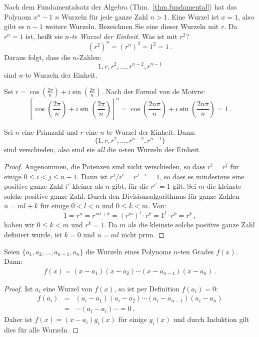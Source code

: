 Nach dem Fundamentalsatz der Algebra (Thm.~\ref{thm.fundamental}) hat das Polynom $x^{n}-1$ $n$ Wurzeln für jede ganze Zahl $n> 1$. Eine Wurzel ist $x=1$, also gibt es $n-1$ weitere Wurzeln. Bezeichnen Sie eine dieser Wurzeln mit $r$. Da $r^{n}=1$ ist, heißt sie \emph{$n$-te Wurzel der Einheit}. Was ist mit $r^2$?
\[
(r^{2})^n=(r^{n})^2=1^2=1\,.
\]
Daraus folgt, dass die $n$-Zahlen:
\[
1, r, r^2, \ldots, r^{n-2}, r^{n-1}
\]
sind $n$-te Wurzeln der Einheit.

\begin{advanced}
Sei $r=\cos \left(\frac{2\pi}{n}\right) + i\sin \left(\frac{2\pi}{n}\right)$.
Nach der Formel von de Moivre:
\[
\left[\cos \left(\frac{2\pi}{n}\right) + i\sin  \left(\frac{2\pi}{n}\right)\right]^{n}=
\cos \left(\frac{2 n\pi}{n}\right) + i\sin  \left(\frac{2 n\pi}{n}\right)= 1\,.
\]
\end{advanced}
\begin{theorem}
Sei $n$ eine Primzahl und $r$ eine $n$-te Wurzel der Einheit. Dann:
\[
\{1,r,r^2,\ldots,r^{n-2},r^{n-1}\}
\]
sind verschieden, also sind sie \emph{all} die $n$-ten Wurzeln der Einheit.
\end{theorem}

\begin{proof}
Angenommen, die Potenzen sind nicht verschieden, so dass $r^i=r^j$ für einige $0\leq i<j\leq n-1$. Dann ist $r^j/r^i=r^{j-i}=1$, so dass es mindestens eine positive ganze Zahl $i'$ kleiner als $n$ gibt, für die $r^{i'}=1$ gilt. Sei $m$ die kleinste solche positive ganze Zahl. Durch den Divisionsalgorithmus für ganze Zahlen $n=ml+k$ für einige $0<l<n$ und $0\leq k<m$. Von:
\[
1=r^n=r^{ml+k}=(r^m)^l\cdot r^k=1^l\cdot r^k=r^k\,,
\]
haben wir $0\leq k<m$ und $r^k=1$. Da $m$ als die kleinste solche positive ganze Zahl definiert wurde, ist $k=0$ und $n=ml$ nicht prim.
\end{proof}

\begin{theorem} Seien $\{a_1,a_2,\ldots,a_{n-1},a_n\}$ die Wurzeln eines Polynoms $n$-ten Grades $f(x)$. Dann:
\begin{align}\label{eq.viete}
f(x) =(x-a_1) (x-a_2)\cdots (x-a_{n-1})(x-a_n)\,.
\end{align}
\end{theorem}

\begin{proof}
Ist $a_i$ eine Wurzel von $f(x)$, so ist per Definition $f(a_i)=0$:
\begin{eqnarray*}
f(a_i)&=&(a_i-a_1) (a_i-a_2)\cdots (a_i-a_{n-1})(a_i-a_n)\\
&=&\cdots (a_i-a_i) \cdots =0\,.
\end{eqnarray*}
Daher ist $f(x)=(x-a_i)g_i(x)$ für einige $g_i(x)$ und durch Induktion gilt dies für alle Wurzeln.
\end{proof}

